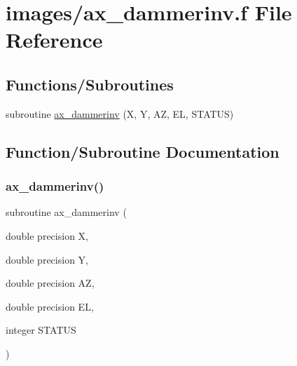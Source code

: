 \hypertarget{ax__dammerinv_8f}{}\section{images/ax\+\_\+dammerinv.f File Reference}
\label{ax__dammerinv_8f}
\subsection*{Functions/\+Subroutines}
\begin{DoxyCompactItemize}
\item 
subroutine \hyperlink{ax__dammerinv_8f_a8dcebba76b0f896b492fa2fa2842d684}{ax\+\_\+dammerinv} (X, Y, AZ, EL, S\+T\+A\+T\+US)
\end{DoxyCompactItemize}


\subsection{Function/\+Subroutine Documentation}
\mbox{\label{ax__dammerinv_8f_a8dcebba76b0f896b492fa2fa2842d684}} 
\subsubsection{\texorpdfstring{ax\+\_\+dammerinv()}{ax\_dammerinv()}}
{\footnotesize\ttfamily subroutine ax\+\_\+dammerinv (\begin{DoxyParamCaption}\item[{double precision}]{X,  }\item[{double precision}]{Y,  }\item[{double precision}]{AZ,  }\item[{double precision}]{EL,  }\item[{integer}]{S\+T\+A\+T\+US }\end{DoxyParamCaption})}

